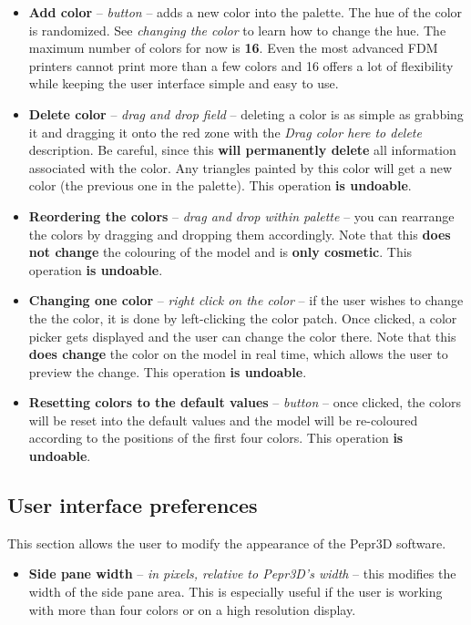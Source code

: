 \begin{itemize}

\item \textbf{Add color} -- \textit{button} -- adds a new color into the palette. The hue of the color is randomized. See \textit{changing the color} to learn how to change the hue. The maximum number of colors for now is \textbf{16}. Even the most advanced FDM printers cannot print more than a few colors and 16 offers a lot of flexibility while keeping the user interface simple and easy to use.

\item \textbf{Delete color} -- \textit{drag and drop field} -- deleting a color is as simple as grabbing it and dragging it onto the red zone with the \textit{Drag color here to delete} description. Be careful, since this \textbf{will permanently delete} all information associated with the color. Any triangles painted by this color will get a new color (the previous one in the palette). This operation \textbf{is undoable}.

\item \textbf{Reordering the colors} -- \textit{drag and drop within palette} -- you can rearrange the colors by dragging and dropping them accordingly. Note that this \textbf{does not change} the colouring of the model and is \textbf{only cosmetic}. This operation \textbf{is undoable}.

\item \textbf{Changing one color} -- \textit{right click on the color} -- if the user wishes to change the the color, it is done by left-clicking the color patch. Once clicked, a color picker gets displayed and the user can change the color there. Note that this \textbf{does change} the color on the model in real time, which allows the user to preview the change. This operation \textbf{is undoable}.

\item \textbf{Resetting colors to the default values } -- \textit{button} -- once clicked, the colors will be reset into the default values and the model will be re-coloured according to the positions of the first four colors. This operation \textbf{is undoable}.

\end{itemize}

\subsection{User interface preferences}

This section allows the user to modify the appearance of the Pepr3D software.

\begin{itemize}

\item \textbf{Side pane width} -- \textit{in pixels, relative to Pepr3D's width} -- this modifies the width of the side pane area. This is especially useful if the user is working with more than four colors or on a high resolution display.

\end{itemize}